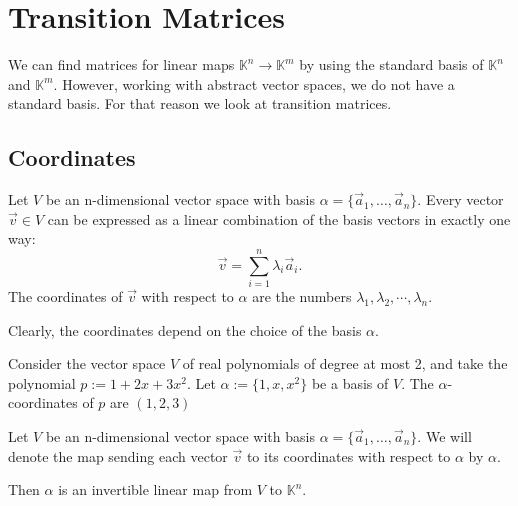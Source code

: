 \section{Transition Matrices}

We can find matrices for linear maps $\mathbb{K}^n \to \mathbb{K}^m$ by using the standard basis of $\mathbb{K}^n$ and $\mathbb{K}^m$.
However, working with abstract vector spaces, we do not have a standard basis. For that reason we look at transition matrices.

\subsection{Coordinates}
\begin{definition}[Coordinates]
    Let $V$ be an n-dimensional vector space with basis $\alpha = \{\vec{a}_1, \dots, \vec{a}_n\}$. Every vector $\vec{v} \in V$ can be
    expressed as a linear combination of the basis vectors in exactly one way:
    \begin{equation}
        \vec{v} = \sum_{i=1}^n \lambda_i \vec{a}_i.
    \end{equation}
    The coordinates of $\vec{v}$ with respect to $\alpha$ are the numbers $\lambda_1, \lambda_2, \cdots, \lambda_n$.
\end{definition}

\begin{remark}
    Clearly, the coordinates depend on the choice of the basis $\alpha$.
\end{remark}

\begin{example}
    Consider the vector space $V$ of real polynomials of degree at most 2, and take the polynomial $p := 1+2x+3x^2$. Let $\alpha := \{1,x,x^2\}$ be a basis of $V$.
    The $\alpha$-coordinates of $p$ are $(1,2,3)$
\end{example}

\begin{theorem}
    Let $V$ be an n-dimensional vector space with basis $\alpha = \{\vec{a}_1, \dots, \vec{a}_n\}$. We will denote the
    map sending each vector $\vec{v}$ to its coordinates with respect to $\alpha$ by $\alpha$.

    Then $\alpha$ is an invertible linear map from $V$ to $\mathbb{K}^n$.
\end{theorem}

